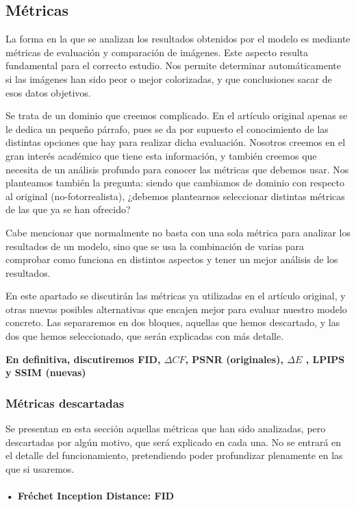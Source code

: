 \documentclass[a4paper]{article}
\begin{document}
\subsection{Métricas}
La forma en la que se analizan los resultados obtenidos por el modelo es mediante métricas de evaluación y comparación de imágenes.
Este aspecto resulta fundamental para el correcto estudio. Nos permite determinar automáticamente si las imágenes han sido peor o mejor colorizadas, y que conclusiones sacar de esos datos objetivos. 

Se trata de un dominio que creemos complicado. En el artículo original apenas se le dedica un pequeño párrafo, pues se da por supuesto el conocimiento de las distintas opciones que hay para realizar dicha evaluación. Nosotros creemos en el gran interés académico que tiene esta información, y también creemos que necesita de un análisis profundo para conocer las métricas que debemos usar. Nos planteamos también la pregunta: siendo que cambiamos de dominio con respecto al original (no-fotorrealista), ¿debemos plantearnos seleccionar distintas métricas de las que ya se han ofrecido?

Cabe mencionar que normalmente no basta con una sola métrica para analizar los resultados de un modelo, sino que se usa la combinación de varias para comprobar como funciona en distintos aspectos y tener un mejor análisis de los resultados.

En este apartado se discutirán las métricas ya utilizadas en el artículo original, y otras nuevas posibles alternativas que encajen mejor para evaluar nuestro modelo concreto. Las separaremos en dos bloques, aquellas que hemos descartado, y las dos que hemos seleccionado, que serán explicadas con más detalle.
\bigskip

\textbf{En definitiva, discutiremos FID, $\Delta CF$, PSNR (originales), $\Delta E$ , LPIPS y SSIM (nuevas)}

\subsubsection{Métricas descartadas}
Se presentan en esta sección aquellas métricas que han sido analizadas, pero descartadas por algún motivo, que será explicado en cada una. No se entrará en el detalle del funcionamiento, pretendiendo poder profundizar plenamente en las que si usaremos.

\paragraph{ • Fréchet Inception Distance: FID \cite{FID}}
\end{document}
